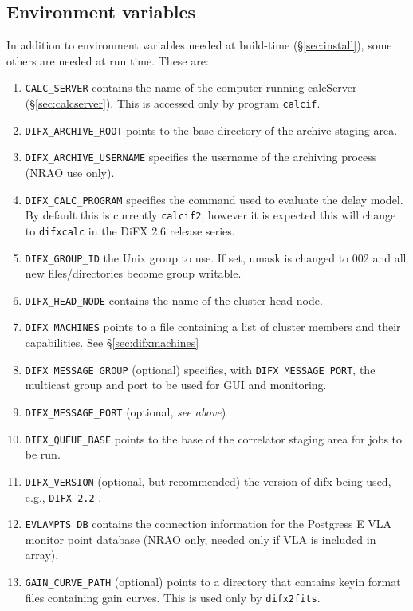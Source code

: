 \subsection{Environment variables} \label{sec:env}

In addition to environment variables needed at build-time (\S\ref{sec:install}), some others are needed at run time.
These are:
\begin{enumerate}
\item {\tt CALC\_SERVER} contains the name of the computer running calcServer (\S\ref{sec:calcserver}).
This is accessed only by program {\tt calcif}.
\item {\tt DIFX\_ARCHIVE\_ROOT} points to the base directory of the archive staging area.
\item {\tt DIFX\_ARCHIVE\_USERNAME} specifies the username of the archiving process (NRAO use only).
\item {\tt DIFX\_CALC\_PROGRAM} specifies the command used to evaluate the delay model.  By default this is currently {\tt calcif2}, however it is expected this will change to {\tt difxcalc} in the DiFX 2.6 release series.
\item {\tt DIFX\_GROUP\_ID} the Unix group to use.  If set, umask is changed to 002 and all new files/directories become group writable.
\item {\tt DIFX\_HEAD\_NODE} contains the name of the cluster head node.
\item {\tt DIFX\_MACHINES} points to a file containing a list of cluster members and their capabilities.
See \S\ref{sec:difxmachines}
\item {\tt DIFX\_MESSAGE\_GROUP} (optional) specifies, with {\tt DIFX\_MESSAGE\_PORT}, the multicast group and port to be used for GUI and monitoring.
\item {\tt DIFX\_MESSAGE\_PORT} (optional, {\em see above})
\item {\tt DIFX\_QUEUE\_BASE} points to the base of the correlator staging area for jobs to be run.
\item {\tt DIFX\_VERSION} (optional, but recommended) the version of difx being used, e.g., {\tt DIFX-2.2} .
\item {\tt EVLAMPTS\_DB} contains the connection information for the Postgress E
VLA monitor point database (NRAO only, needed only if VLA is included in array).
\item {\tt GAIN\_CURVE\_PATH} (optional) points to a directory that contains keyin format files containing gain curves.
This is used only by {\tt difx2fits}.

\end{enumerate}
